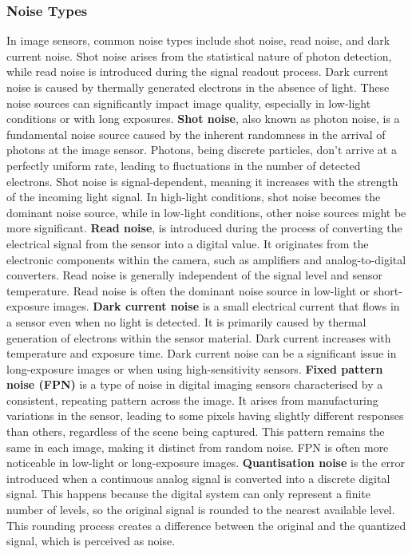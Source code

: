 \subsubsection{Noise Types}
In image sensors, common noise types include shot noise, read noise, and dark current noise. Shot noise arises from the statistical nature of photon detection, while read noise is introduced during the signal readout process. Dark current noise is caused by thermally generated electrons in the absence of light. These noise sources can significantly impact image quality, especially in low-light conditions or with long exposures. 
\nl
\textbf{Shot noise}, also known as photon noise, is a fundamental noise source caused by the inherent randomness in the arrival of photons at the image sensor.
Photons, being discrete particles, don't arrive at a perfectly uniform rate, leading to fluctuations in the number of detected electrons.  Shot noise is signal-dependent, meaning it increases with the strength of the incoming light signal. 
In high-light conditions, shot noise becomes the dominant noise source, while in low-light conditions, other noise sources might be more significant. 
\nl
\textbf{Read noise}, is introduced during the process of converting the electrical signal from the sensor into a digital value. It originates from the electronic components within the camera, such as amplifiers and analog-to-digital converters.
Read noise is generally independent of the signal level and sensor temperature. Read noise is often the dominant noise source in low-light or short-exposure images.
\nl
\textbf{Dark current noise}  is a small electrical current that flows in a sensor even when no light is detected. It is primarily caused by thermal generation of electrons within the sensor material.
Dark current increases with temperature and exposure time. Dark current noise can be a significant issue in long-exposure images or when using high-sensitivity sensors. 
\nl
\textbf{Fixed pattern noise (FPN)} is a type of noise in digital imaging sensors characterised by a consistent, repeating pattern across the image. It arises from manufacturing variations in the sensor, leading to some pixels having slightly different responses than others, regardless of the scene being captured. This pattern remains the same in each image, making it distinct from random noise. FPN is often more noticeable in low-light or long-exposure images. 
\nl
\textbf{Quantisation noise} is the error introduced when a continuous analog signal is converted into a discrete digital signal. This happens because the digital system can only represent a finite number of levels, so the original signal is rounded to the nearest available level. This rounding process creates a difference between the original and the quantized signal, which is perceived as noise. 

